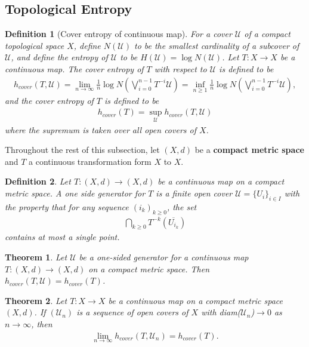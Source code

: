 \documentclass[a4paper,10pt]{amsart}
\newtheorem{theorem}{Theorem}[section]
\newtheorem{definition}{Definition}[section]
\newcommand{\UUU}{\mathcal U}
\begin{document}
\subsection{Topological Entropy}

\begin{definition}[Cover entropy of continuous map] 
    For a cover $\UUU$ of a compact topological space $X$,
    define $N(\UUU)$ to be the smallest cardinality of a subcover of
    $\UUU$, and define the entropy of $\UUU$ to be $H(\UUU) = \log N(\UUU)$.
    Let $T: X \rightarrow X$ be a continuous map. The cover entropy
    of $T$ with respect to $\UUU$ is defined to be 
    \begin{align*}
        h_{cover}(T, \UUU) = \lim_{n \rightarrow \infty}
        \frac{1}{n}\log N(\bigvee^{n-1}_{i = 0} T^{-i}\UUU)
        = \inf_{n \geq 1}\frac{1}{n}\log N(\bigvee^{n-1}_{i = 0} 
        T^{-i}\UUU),
    \end{align*}
    and the cover entropy of $T$ is defined to be 
    \begin{align*}
        h_{cover}(T) = \sup_{\UUU}h_{cover}(T, \UUU)  
    \end{align*}
    where the supremum is taken over all open covers of $X$.
\end{definition}

Throughout the rest of this subsection, let $(X, d)$ be a 
\textbf{compact metric space} and 
$T$ a continuous transformation form $X$ to $X$. 

\begin{definition}
    Let $T: (X, d) \rightarrow (X, d)$ be a continuous map on a 
    compact metric space. A one side generator for $T$ is a finite 
    open cover $\UUU = \{U_i\}_{i \in I}$ with the property that 
    for any sequence $(i_k)_{k \geq 0}$, the set
    \begin{align*}
        \bigcap_{k \geq 0} T^{-k}(\overline{U_{i_k}}) 
    \end{align*}
    contains at most a single point.
\end{definition}

\begin{theorem}
   Let $\UUU$ be a one-sided generator for a continuous map
   $T : (X,d) \rightarrow (X,d)$ on a compact metric space.
   Then $h_{cover}(T, \UUU) = h_{cover}(T)$.
\end{theorem}

\begin{theorem}
   Let $T: X \rightarrow X$ be a continuous map on a compact metric
   space $(X, d)$. If $(\UUU_{n})$ is a sequence of open covers of 
   $X$ with diam($\UUU_n$)$\rightarrow 0$ as $n \rightarrow \infty$,
   then
   \begin{align*}
       \lim_{n \rightarrow \infty}h_{cover}(T, \UUU_n) = h_{cover}(T). 
   \end{align*}
\end{theorem}
\end{document}
